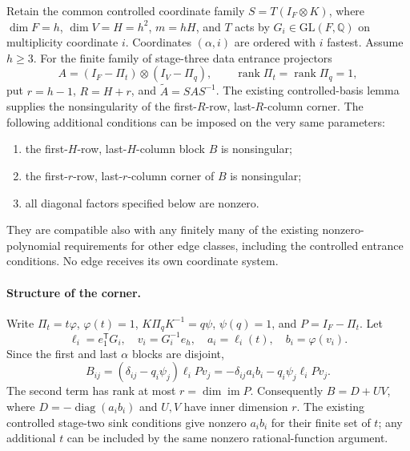 Retain the common controlled coordinate family
\(S=T(I_F\otimes K)\), where \(\dim F=h\), \(\dim V=H=h^2\),
\(m=hH\), and \(T\) acts by \(G_i\in\mathrm{GL}(F,\mathbb Q)\)
on multiplicity coordinate \(i\). Coordinates \((\alpha,i)\) are ordered
with \(i\) fastest. Assume \(h\ge3\). For the finite family of stage-three
data entrance projectors
\[
 A=(I_F-\Pi_t)\otimes(I_V-\Pi_q),\qquad
 \operatorname{rank}\Pi_t=\operatorname{rank}\Pi_q=1,
\]
put \(r=h-1\), \(R=H+r\), and \(\widetilde A=SAS^{-1}\).
The existing controlled-basis lemma supplies the nonsingularity of the
first-\(R\)-row, last-\(R\)-column corner. The following additional
conditions can be imposed on the very same parameters:
\begin{enumerate}
\item the first-\(H\)-row, last-\(H\)-column block \(B\) is nonsingular;
\item the first-\(r\)-row, last-\(r\)-column corner of \(B\) is nonsingular;
\item all diagonal factors specified below are nonzero.
\end{enumerate}
They are compatible also with any finitely many of the existing
nonzero-polynomial requirements for other edge classes, including the
controlled entrance conditions. No edge receives its own coordinate system.

\paragraph{Structure of the corner.}
Write \(\Pi_t=t\varphi\), \(\varphi(t)=1\),
\(K\Pi_qK^{-1}=q\psi\), \(\psi(q)=1\), and \(P=I_F-\Pi_t\).
Let
\[
 \ell_i=e_1^{\mathsf T}G_i,\quad v_i=G_i^{-1}e_h,\quad
 a_i=\ell_i(t),\quad b_i=\varphi(v_i).
\]
Since the first and last \(\alpha\) blocks are disjoint,
\[
 B_{ij}=(\delta_{ij}-q_i\psi_j)\ell_iPv_j
       =-\delta_{ij}a_i b_i-q_i\psi_j\ell_iPv_j.
\]
The second term has rank at most \(r=\dim\operatorname{im}P\).
Consequently \(B=D+UV\), where
\(D=-\operatorname{diag}(a_i b_i)\) and \(U,V\) have inner dimension \(r\).
The existing controlled stage-two sink conditions give nonzero
\(a_i b_i\) for their finite set of \(t\); any additional \(t\) can be
included by the same nonzero rational-function argument.

